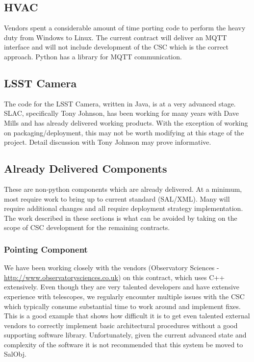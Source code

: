 \documentclass[TS,authoryear,toc]{lsstdoc}
\begin{document}
\subsection{HVAC}
Vendors spent a considerable amount of time porting code to perform the heavy duty from Windows to Linux. The current contract will deliver an MQTT interface and will not include development of the CSC which is the correct approach. Python has a library for MQTT communication.

\subsection{LSST Camera}
The code for the LSST Camera, written in Java, is at a very advanced stage. SLAC, specifically Tony Johnson, has been working for many years with Dave Mills and has already delivered working products. With the exception of working on packaging/deployment, this may not be worth modifying at this stage of the project. Detail discussion with Tony Johnson may prove informative. 

\subsection{Already Delivered Components}
These are non-python components which are already delivered. At a minimum, most require work to bring up to current standard (SAL/XML). Many will require additional changes and all require deployment strategy implementation. The work described in these sections is what can be avoided by taking on the scope of CSC development for the remaining contracts.

\subsubsection{Pointing Component}
We have been working closely with the vendors (Observatory Sciences - \url{http://www.observatorysciences.co.uk}) on this contract, which uses C++ extensively. Even though they are very talented developers and have extensive experience with telescopes, we regularly encounter multiple issues with the CSC which typically consume substantial time to work around and implement fixes. This is a good example that shows how difficult it is to get even talented external vendors to correctly implement basic architectural procedures without a good supporting software library. Unfortunately, given the current advanced state and complexity of the software it is not recommended that this system be moved to SalObj.
\end{document}

